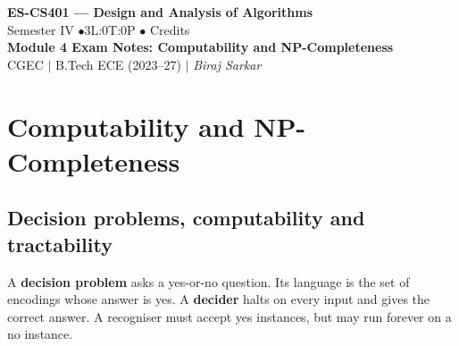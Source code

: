 \documentclass[12pt,a4paper]{article}
\begin{document}
\begin{center}
  {\LARGE\bfseries\color{myred} ES-CS401 --- Design and Analysis of Algorithms}\\[5pt]
  {\normalsize\color{mydark} Semester IV \quad$\bullet$\quad 3L:0T:0P \quad$\bullet$ Credits}\\[3pt]
  {\normalsize\color{myteal}\textbf{Module 4 Exam Notes: Computability and NP-Completeness}}\\[3pt]
  {\small\color{mydark} CGEC \;$|$\; B.Tech ECE (2023--27) \;$|$\; \textit{Biraj Sarkar}}
\end{center}
\vspace{2pt}
\noindent{\color{myred}\rule{\linewidth}{1.5pt}}
\vspace{2pt}

\hypersetup{linkcolor=mydark}
\tableofcontents
\hypersetup{linkcolor=myteal}
\newpage

\section{Computability and NP-Completeness}
\subsection{Decision problems, computability and tractability}
\begin{tcolorbox}[defbox, title={Decision problem and decider}]
A \textbf{decision problem} asks a yes-or-no question. Its language is the set of encodings whose answer is yes. A \textbf{decider} halts on every input and gives the correct answer. A recogniser must accept yes instances, but may run forever on a no instance.
\end{tcolorbox}
\end{document}
